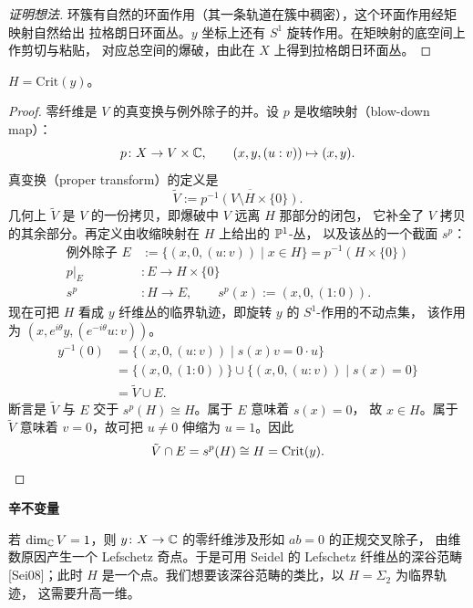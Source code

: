 \begin{proof}[证明想法]
环簇有自然的环面作用（其一条轨道在簇中稠密），这个环面作用经矩映射自然给出
拉格朗日环面丛。$y$ 坐标上还有 $S^1$ 旋转作用。在矩映射的底空间上作剪切与粘贴，
对应总空间的爆破，由此在 $X$ 上得到拉格朗日环面丛。\qedhere
\end{proof}

\begin{lemma}\label{lem:critical-locus}
$H=\mathrm{Crit}(y)$。
\end{lemma}

\begin{proof}
零纤维是 $V$ 的真变换与例外除子的并。设 $p$ 是收缩映射（blow-down map）：
\[
p\colon X\to V\times\mathbb{C},\qquad (x,y,(u:v))\mapsto(x,y).
\]
真变换（proper transform）的定义是
\[
\tilde V := \overline{p^{-1}(V\setminus H\times\{0\})}.
\]
几何上 $\tilde V$ 是 $V$ 的一份拷贝，即爆破中 $V$ 远离 $H$ 那部分的闭包，
它补全了 $V$ 拷贝的其余部分。再定义由收缩映射在 $H$ 上给出的 $\mathbb{P}^1$-丛，
以及该丛的一个截面 $s^p$：
\begin{align*}
\text{例外除子 } E &:= \{(x,0,(u:v))\mid x\in H\}=p^{-1}(H\times\{0\})\\
p|_E &\colon E\to H\times\{0\}\\
s^p &\colon H\to E,\qquad s^p(x) := (x,0,(1:0)).
\end{align*}
现在可把 $H$ 看成 $y$ 纤维丛的临界轨迹，即旋转 $y$ 的 $S^1$-作用的不动点集，
该作用为 $(x,e^{i\theta}y,(e^{-i\theta}u:v))$。
\begin{align*}
y^{-1}(0) &= \{(x,0,(u:v))\mid s(x)v=0\cdot u\}\\
&= \{(x,0,(1:0))\}\cup\{(x,0,(u:v))\mid s(x)=0\}\\
&= \tilde V\cup E.
\end{align*}
断言是 $\tilde V$ 与 $E$ 交于 $s^p(H)\cong H$。属于 $E$ 意味着 $s(x)=0$，
故 $x\in H$。属于 $\tilde V$ 意味着 $v=0$，故可把 $u\neq0$ 伸缩为 $u=1$。因此
\[
\tilde V\cap E=s^p(H)\cong H=\mathrm{Crit}(y).\qedhere
\]
\end{proof}

\medskip\noindent\textbf{辛不变量}\par

\begin{remark}\label{rem:dim1}
若 $\dim_{\mathbb{C}}V=1$，则 $y\colon X\to\mathbb{C}$ 的零纤维涉及形如 $ab=0$ 的正规交叉除子，
由维数原因产生一个 Lefschetz 奇点。于是可用 Seidel 的 Lefschetz 纤维丛的深谷范畴
[Sei08]；此时 $H$ 是一个点。我们想要该深谷范畴的类比，以 $H=\Sigma_2$ 为临界轨迹，
这需要升高一维。
\end{remark}

